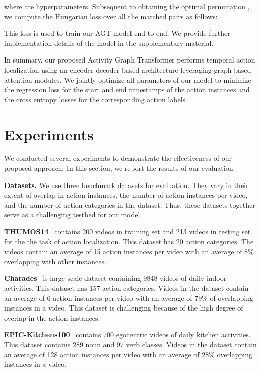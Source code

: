 \documentclass[10pt,twocolumn,letterpaper]{article}
\begin{document}
where  are hyperparameters. Subsequent to obtaining the optimal permutation , we compute the Hungarian loss  over all the matched pairs as follows:

This loss is used to train our AGT model end-to-end. We provide further implementation details of the model in the supplementary material.

In summary, our proposed Activity Graph Transformer performs temporal action localization using an encoder-decoder based architecture leveraging graph based attention modules. We jointly optimize all parameters of our model to minimize the regression loss for the start and end timestamps of the action instances and the cross entropy losses for the corresponding action labels.  




 
\section{Experiments}
We conducted several experiments to demonstrate the effectiveness of our proposed approach. In this section, we report the results of our evaluation.

\vspace{0.05in}
\noindent
\textbf{Datasets.} We use three benchmark datasets for evaluation. They vary in their extent of overlap in action instances, the number of action instances per video, and the number of action categories in the dataset. Thus, these datasets together serve as a challenging testbed for our model.

\textbf{THUMOS14}~\cite{THUMOS14} contains 200 videos in training set and 213 videos in testing set for the the task of action localization. This dataset has 20 action categories. The videos contain an average of 15 action instances per video with an average of 8\%  overlapping with other instances.

\textbf{Charades}~\cite{sigurdsson2016hollywood} is large scale dataset containing 9848 videos of daily indoor activities. This dataset has 157 action categories. Videos in the dataset contain an average of 6 action instances per video with an average of 79\% of overlapping instances in a video. This dataset is challenging because of the high degree of overlap in the action instances. 


\textbf{EPIC-Kitchens100}~\cite{Damen2020RESCALING} contains 700 egocentric videos of daily kitchen activities. This dataset contains 289 noun and 97 verb classes. Videos in the dataset contain an average of 128 action instances per video with an average of 28\% overlapping instances in a video. 
\end{document}
